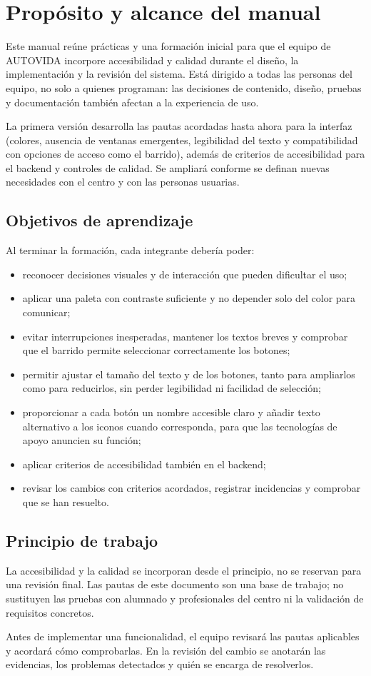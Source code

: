 \section{Propósito y alcance del manual}

Este manual reúne prácticas y una formación inicial para que el equipo de AUTOVIDA incorpore accesibilidad y calidad durante el diseño, la implementación y la revisión del sistema. Está dirigido a todas las personas del equipo, no solo a quienes programan: las decisiones de contenido, diseño, pruebas y documentación también afectan a la experiencia de uso.

La primera versión desarrolla las pautas acordadas hasta ahora para la interfaz (colores, ausencia de ventanas emergentes, legibilidad del texto y compatibilidad con opciones de acceso como el barrido), además de criterios de accesibilidad para el backend y controles de calidad. Se ampliará conforme se definan nuevas necesidades con el centro y con las personas usuarias.

\subsection{Objetivos de aprendizaje}
Al terminar la formación, cada integrante debería poder:
\begin{itemize}[leftmargin=*]
  \item reconocer decisiones visuales y de interacción que pueden dificultar el uso;
  \item aplicar una paleta con contraste suficiente y no depender solo del color para comunicar;
  \item evitar interrupciones inesperadas, mantener los textos breves y comprobar que el barrido permite seleccionar correctamente los botones;
  \item permitir ajustar el tamaño del texto y de los botones, tanto para ampliarlos como para reducirlos, sin perder legibilidad ni facilidad de selección;
  \item proporcionar a cada botón un nombre accesible claro y añadir texto alternativo a los iconos cuando corresponda, para que las tecnologías de apoyo anuncien su función;
  \item aplicar criterios de accesibilidad también en el backend;
  \item revisar los cambios con criterios acordados, registrar incidencias y comprobar que se han resuelto.
\end{itemize}

\subsection{Principio de trabajo}
La accesibilidad y la calidad se incorporan desde el principio, no se reservan para una revisión final. Las pautas de este documento son una base de trabajo; no sustituyen las pruebas con alumnado y profesionales del centro ni la validación de requisitos concretos.

\begin{infobox}[title={Cómo utilizar este manual}]
Antes de implementar una funcionalidad, el equipo revisará las pautas aplicables y acordará cómo comprobarlas. En la revisión del cambio se anotarán las evidencias, los problemas detectados y quién se encarga de resolverlos.
\end{infobox}